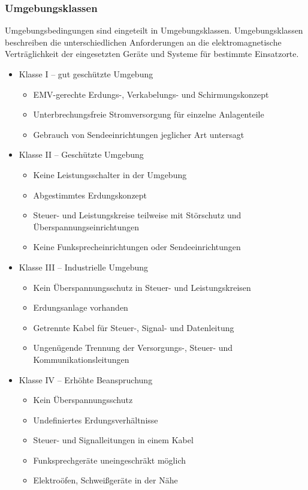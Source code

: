 \subsubsection{Umgebungsklassen}
Umgebungsbedingungen sind eingeteilt in Umgebungsklassen. Umgebungsklassen beschreiben die unterschiedlichen Anforderungen an die elektromagnetische Verträglichkeit der eingesetzten Geräte und Systeme für bestimmte Einsatzorte.
\begin{itemize}
\item Klasse I -- gut geschützte Umgebung
	\begin{itemize}
	\item EMV-gerechte Erdungs-, Verkabelungs- und Schirmungskonzept
	\item Unterbrechungsfreie Stromversorgung für einzelne Anlagenteile
	\item Gebrauch von Sendeeinrichtungen jeglicher Art untersagt
	\end{itemize}
\item Klasse II -- Geschützte Umgebung
	\begin{itemize}
	\item Keine Leistungsschalter in der Umgebung
	\item Abgestimmtes Erdungskonzept
	\item Steuer- und Leistungskreise teilweise mit Störschutz und Überspannungseinrichtungen
	\item Keine Funksprecheinrichtungen oder Sendeeinrichtungen
	\end{itemize}
\item Klasse III -- Industrielle Umgebung
	\begin{itemize}
	\item Kein Überspannungsschutz in Steuer- und Leistungskreisen
	\item Erdungsanlage vorhanden
	\item Getrennte Kabel für Steuer-, Signal- und Datenleitung
	\item Ungenügende Trennung der Versorgungs-, Steuer- und Kommunikationsleitungen
	\end{itemize}
\item Klasse IV -- Erhöhte Beanspruchung
	\begin{itemize}
	\item Kein Überspannungsschutz
	\item Undefiniertes Erdungsverhältnisse
	\item Steuer- und Signalleitungen in einem Kabel
	\item Funksprechgeräte uneingeschräkt möglich
	\item Elektroöfen, Schweißgeräte in der Nähe
	\end{itemize}
\end{itemize}


